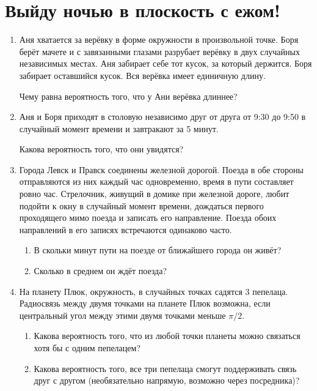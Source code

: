 \documentclass[12pt]{article}
\begin{document}
\section{Выйду ночью в плоскость с ежом!}

\begin{enumerate}


\item Аня хватается за верёвку в форме окружности в произвольной точке.
    Боря берёт мачете и с завязанными глазами разрубает верёвку в двух случайных независимых местах. 
    Аня забирает себе тот кусок, за который держится. Боря забирает оставшийся кусок. 
    Вся верёвка имеет единичную длину.
      
Чему равна вероятность того, что у Ани верёвка длиннее?

\item Аня и Боря приходят в столовую независимо друг от друга от 9:30 до 9:50 в случайный момент времени и завтракают за 5 минут. 

Какова вероятность того, что они увидятся?


\item Города Левск и Правск соединены железной дорогой. 
Поезда в обе стороны отправляются из них каждый час одновременно, время в пути составляет ровно час. 
Стрелочник, живущий в домике при железной дороге, любит подойти к окну в случайный момент времени, 
дождаться первого проходящего мимо поезда и записать его направление. 
Поезда обоих направлений в его записях встречаются одинаково часто. 
  
  \begin{enumerate}
      \item В скольки минут пути на поезде от ближайшего города он живёт?
      \item Сколько в среднем он ждёт поезда?
  \end{enumerate}


\item 

На планету Плюк, окружность, в случайных точках садятся $3$ пепелаца.
Радиосвязь между двумя точками на планете Плюк возможна,
если центральный угол между этими двумя точками меньше $\pi/2$.

\begin{enumerate}
\item Какова вероятность того,
что из любой точки планеты можно связаться хотя бы с одним пепелацем?
\item Какова вероятность того,
все три пепелаца смогут поддерживать связь друг с другом
(необязательно напрямую, возможно через посредника)?
\end{enumerate}


\end{enumerate}
\end{document}
